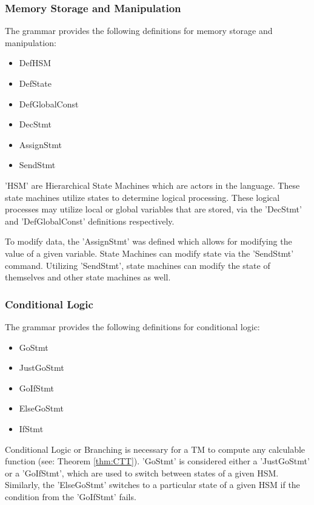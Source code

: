 \subsubsection{Memory Storage and Manipulation}\label{subsubsec:MemStoManip}

The grammar provides the following definitions for memory storage and manipulation:
\begin{itemize}
    \item DefHSM
    \item DefState
    \item DefGlobalConst
    \item DecStmt
    \item AssignStmt
    \item SendStmt
\end{itemize}

'HSM' are Hierarchical State Machines which are actors in the language.
These state machines utilize states to determine logical processing.
These logical processes may utilize local or global variables that are stored, via the 'DecStmt' and 'DefGlobalConst' definitions respectively.

To modify data, the 'AssignStmt' was defined which allows for modifying the value of a given variable.
State Machines can modify state via the 'SendStmt' command.
Utilizing 'SendStmt', state machines can modify the state of themselves and other state machines as well.

\subsubsection{Conditional Logic}\label{subsubsec:CondLog}

The grammar provides the following definitions for conditional logic:
\begin{itemize}
    \item GoStmt
    \item JustGoStmt
    \item GoIfStmt
    \item ElseGoStmt
    \item IfStmt
\end{itemize}

Conditional Logic or Branching is necessary for a TM to compute any calculable function (see: Theorem \ref{thm:CTT}).
'GoStmt' is considered either a 'JustGoStmt' or a 'GoIfStmt', which are used to switch between states of a given HSM.
Similarly, the 'ElseGoStmt' switches to a particular state of a given HSM if the condition from the 'GoIfStmt' fails.

